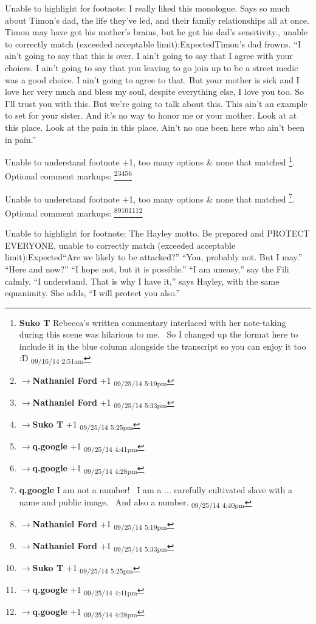 	Unable to highlight for footnote: I really liked this monologue.  Says so much about Timon's dad, the life they've led, and their family relationships all at once.  Timon may have got his mother's brains, but he got his dad's sensitivity., unable to correctly match (exceeded acceptable limit):ExpectedTimon’s dad frowns.  “I ain’t going to say that this is over.  I ain’t going to say that I agree with your choices.  I ain’t going to say that you leaving to go join up to be a street medic was a good choice.  I ain’t going to agree to that.  But your mother is sick and I love her very much and bless my soul, despite everything else, I love you too.  So I’ll trust you with this.  But we’re going to talk about this.  This ain’t an example to set for your sister.  And it’s no way to honor me or your mother.  Look at at this place.  Look at the pain in this place.  Ain’t no one been here who ain’t been in pain.”

	Unable to understand footnote +1, too many options & none that matched \footnote{\textbf{Suko T }Rebecca's written commentary interlaced with her note-taking during this scene was hilarious to me.  So I changed up the format here to include it in the blue column alongside the transcript so you can enjoy it too :D \textsubscript{09/16/14 2:51am}}. Optional comment markups: \footnote{$\rightarrow$\textbf{Nathaniel Ford }+1 \textsubscript{09/25/14 5:19pm}}\footnote{$\rightarrow$\textbf{Nathaniel Ford }+1 \textsubscript{09/25/14 5:33pm}}\footnote{$\rightarrow$\textbf{Suko T }+1 \textsubscript{09/25/14 5:25pm}}\footnote{$\rightarrow$\textbf{q.google }+1 \textsubscript{09/25/14 4:41pm}}\footnote{$\rightarrow$\textbf{q.google }+1 \textsubscript{09/25/14 4:28pm}} 

	Unable to understand footnote +1, too many options & none that matched \footnote{\textbf{q.google }I am not a number!  I am a ... carefully cultivated slave with a name and public image.  And also a number. \textsubscript{09/25/14 4:40pm}}. Optional comment markups: \footnote{$\rightarrow$\textbf{Nathaniel Ford }+1 \textsubscript{09/25/14 5:19pm}}\footnote{$\rightarrow$\textbf{Nathaniel Ford }+1 \textsubscript{09/25/14 5:33pm}}\footnote{$\rightarrow$\textbf{Suko T }+1 \textsubscript{09/25/14 5:25pm}}\footnote{$\rightarrow$\textbf{q.google }+1 \textsubscript{09/25/14 4:41pm}}\footnote{$\rightarrow$\textbf{q.google }+1 \textsubscript{09/25/14 4:28pm}} 

	Unable to highlight for footnote: The Hayley motto.  Be prepared and PROTECT EVERYONE, unable to correctly match (exceeded acceptable limit):Expected“Are we likely to be attacked?”
“You, probably not.  But I may.”
“Here and now?”
“I hope not, but it is possible.”
“I am uneasy,” say the Fili calmly.
“I understand.  That is why I have it,” says Hayley, with the same equanimity.  She adds, “I will protect you also.”

